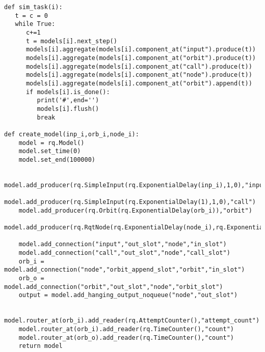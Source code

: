 \begin{lstlisting}
def sim_task(i):
   t = c = 0
   while True:
      c+=1 
      t = models[i].next_step()
      models[i].aggregate(models[i].component_at("input").produce(t))
      models[i].aggregate(models[i].component_at("orbit").produce(t))
      models[i].aggregate(models[i].component_at("call").produce(t))
      models[i].aggregate(models[i].component_at("node").produce(t))
      models[i].aggregate(models[i].component_at("orbit").append(t))
      if models[i].is_done():
         print('#',end='')
         models[i].flush()
         break

def create_model(inp_i,orb_i,node_i):
	model = rq.Model()
	model.set_time(0) 
	model.set_end(100000)
	
	model.add_producer(rq.SimpleInput(rq.ExponentialDelay(inp_i),1,0),"input")
	model.add_producer(rq.SimpleInput(rq.ExponentialDelay(1),1,0),"call")
	model.add_producer(rq.Orbit(rq.ExponentialDelay(orb_i)),"orbit")
	model.add_producer(rq.RqtNode(rq.ExponentialDelay(node_i),rq.ExponentialDelay(1.15)),"node")
	
	model.add_connection("input","out_slot","node","in_slot")
	model.add_connection("call","out_slot","node","call_slot")
	orb_i = model.add_connection("node","orbit_append_slot","orbit","in_slot")
	orb_o = model.add_connection("orbit","out_slot","node","orbit_slot")
	output = model.add_hanging_output_noqueue("node","out_slot")
	
	model.router_at(orb_i).add_reader(rq.AttemptCounter(),"attempt_count")
	model.router_at(orb_i).add_reader(rq.TimeCounter(),"count")
	model.router_at(orb_o).add_reader(rq.TimeCounter(),"count")
	return model
\end{lstlisting}


